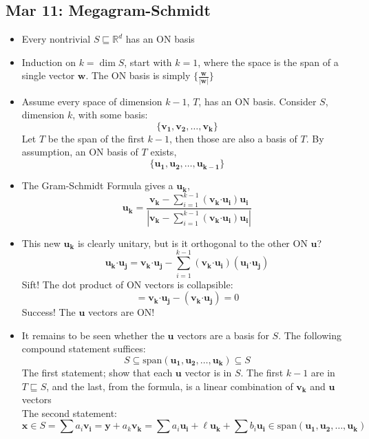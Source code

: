 \documentclass[10pt, oneside]{article}
\let\subspeq\sqsubseteq
\newcommand{\R}{\mathbb{R}}
\newcommand{\Cdot}{\boldsymbol{\cdot}}
\renewcommand{\vec}[1]{\mathbf{#1}}
\begin{document}
\subsection{Mar 11: Megagram-Schmidt}
\begin{itemize}
    \item Every nontrivial $S \subspeq \R^d$ has an ON basis
    \item Induction on $k = \dim S$, start with $k = 1$, where the space is the span of a single vector $\vec{w}$. The ON basis is simply $\{\frac{\vec{w}}{|\vec{w}|}\}$
    \item Assume every space of dimension $k-1$, $T$, has an ON basis. Consider $S$, dimension $k$, with some basis:
        \[\{\vec{v_1},\vec{v_2},\hdots,\vec{v_k}\}\]
        Let $T$ be the span of the first $k-1$, then those are also a basis of $T$. By assumption, an ON basis of $T$ exists,
        \[\{\vec{u_1},\vec{u_2},\hdots,\vec{u_{k-1}}\}\]
    \item The Gram-Schmidt Formula gives a $\vec{u_k}$,
        \[\vec{u_k} = \frac{\vec{v_k} - \sum_{i=1}^{k-1} (\vec{v_k} \Cdot \vec{u_i})\vec{u_i}}{|\vec{v_k} - \sum_{i=1}^{k-1} (\vec{v_k} \Cdot \vec{u_i})\vec{u_i}|}\]
    \item This new $\vec{u_k}$ is clearly unitary, but is it orthogonal to the other ON $\vec{u}$?
        \[\vec{u_k} \Cdot \vec{u_j} = \vec{v_k} \Cdot \vec{u_j}  - \sum_{i=1}^{k-1} (\vec{v_k} \Cdot \vec{u_i}) (\vec{u_i} \Cdot \vec{u_j})\]
        Sift! The dot product of ON vectors is collapsible:
        \[= \vec{v_k} \Cdot \vec{u_j}  - (\vec{v_k} \Cdot \vec{u_j}) = 0\]
        Success! The $\vec{u}$ vectors are ON!
    \item It remains to be seen whether the $\vec{u}$ vectors are a basis for $S$. The following compound statement suffices:
        \[S \subseteq \text{span} (\vec{u_1},\vec{u_2},\hdots,\vec{u_k}) \subseteq S\]
        The first statement; show that each $\vec{u}$ vector is in $S$. The first $k-1$ are in $T \subspeq S$, and the last, from the formula, is a linear combination of $\vec{v_k}$ and $\vec{u}$ vectors\\
        The second statement:
        \[\vec{x} \in S = \sum a_i \vec{v_i} = \vec{y} + a_k \vec{v_k} = \sum a_i \vec{u_i} + \ell \vec{u_k} + \sum b_i \vec{u_i} \in \text{span} (\vec{u_1},\vec{u_2},\hdots,\vec{u_k})\]
\end{itemize}
\end{document}
